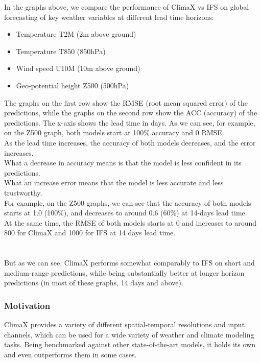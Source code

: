 \documentclass[../paper.tex]{subfiles}
\begin{document}
        In the graphs above,
        we compare the performance of ClimaX vs IFS on global forecasting of key weather variables at different lead time horizons:
        \begin{itemize}
            \item Temperature T2M (2m above ground)
            \item Temperature T850 (850hPa)
            \item Wind speed U10M (10m above ground)
            \item Geo-potential height Z500 (500hPa)
        \end{itemize}
        The graphs on the first row show the RMSE (root mean squared error) of the predictions,
        while the graphs on the second row show the ACC (accuracy) of the predictions.
        The x-axis shows the lead time in days.
        As we can see, for example, on the Z500 graph, both models start at 100\% accuracy and 0 RMSE.\\
        As the lead time increases, the accuracy of both models decreases, and the error increases.\\
        What a decrease in accuracy means is that the model is less confident in its predictions.\\
        What an increase error means that the model is less accurate and less trustworthy.\\

        For example, on the Z500 graphs, we can see that the accuracy of both models starts at 1.0 (100\%),
        and decreases to around 0.6 (60\%) at 14-days lead time.\\
        At the same time,
        the RMSE of both models starts at 0
        and increases to around 800 for ClimaX and 1000 for IFS at 14 days lead time.\\
        \\\\
        But as we can see, ClimaX performs somewhat comparably to IFS on short and medium-range predictions,
        while being substantially better at longer horizon predictions (in most of these graphs, 14 days and above).
    \subsubsection{Motivation}
        ClimaX provides a variety of different spatial-temporal resolutions and input channels,
        which can be used for a wide variety of weather and climate modeling tasks.
        Being benchmarked against other state-of-the-art models, it holds its own and even outperforms them in some cases.
\end{document}

